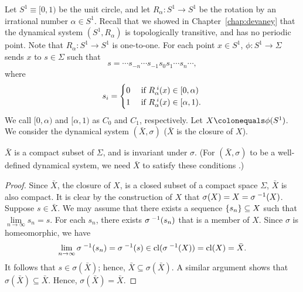 \documentclass[10pt,twoside,draft]{book}
\begin{document}
\begin{example}
  Let $S^1 \equiv [0, 1)$ be the unit circle, and let $R_\alpha: S^1 \to S^1$ be the rotation by an irrational number $\alpha \in S^1$. %
  Recall that we showed in Chapter~\ref{chap:devaney} that the dynamical system $(S^1, R_\alpha)$ is topologically transitive, and has no periodic point.
  Note that $R_\alpha: S^1 \to S^1$ is one-to-one.
  For each point $x \in S^1$, $\phi: S^1 \to \Sigma$ sends $x$ to $s \in \Sigma$ such that
  \begin{equation*}
    s = \cdots s_{-n} \cdots s_{-1} s_0 s_1 \cdots s_n \cdots,
  \end{equation*}
  where
  \begin{equation*}
    s_i = \begin{cases}
      0& \mbox{ if } \itr{R_\alpha}{i}(x) \in [0, \alpha)  \\ %
      1& \mbox{ if } \itr{R_\alpha}{i}(x) \in [\alpha, 1). %
    \end{cases}
  \end{equation*} %
  We call $[0, \alpha)$ and $[\alpha, 1)$ as $C_0$ and $C_1$, respectively. %
  Let $X \ceq \phi(S^1)$.
  We consider the dynamical system $(\bar{X}, \sigma)$ ($\bar{X}$ is the closure of $X$).
  \begin{proposition}
    $\bar{X}$ is a compact subset of $\Sigma$, and is invariant under $\sigma$.
    (For $(\bar{X}, \sigma)$ to be a well-defined dynamical system, we need $\bar{X}$ to satisfy these conditions \citep[p.179]{lind}.)
    \begin{proof}
      Since $\bar{X}$, the closure of $X$, is a closed subset of a compact space $\Sigma$, $\bar{X}$ is also compact.
      It is clear by the construction of $X$ that $\sigma(X) = X = \sigma^{\;-1}(X)$.
      Suppose $s \in \bar{X}$.
      We may assume that there exists a sequence $\left \{ s_n \right \} \subseteq X$ such that $\lim\limits_{n \to \infty} s_n = s$.
      For each $s_n$, there exists $\sigma^{\;-1}(s_n)$ that is a member of $X$.
      Since $\sigma$ is homeomorphic, we have 
      \begin{equation*}
        \lim\limits_{n \to \infty} \sigma^{\;-1}(s_n) 
        = \sigma^{\;-1}(s) 
        \in \mathrm{cl}(\sigma^{\;-1}(X)) 
        = \mathrm{cl}(X) 
        = \bar{X}.
      \end{equation*}
      It follows that $s \in \sigma(\bar{X})$; hence, $\bar{X} \subseteq \sigma(\bar{X})$.
      A similar argument shows that $\sigma(\bar{X}) \subseteq \bar{X}$.
      Hence, $\sigma(\bar{X}) = \bar{X}$.
    \end{proof}

\end{proposition}
\end{example}
\end{document}
